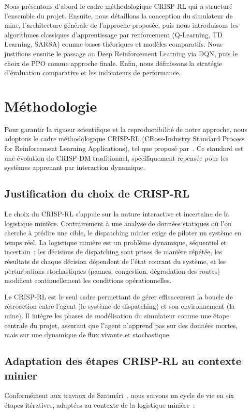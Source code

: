 \documentclass[11pt,a4paper]{report}
\begin{document}
Nous présentons d'abord le cadre méthodologique CRISP-RL qui a structuré l'ensemble du projet. Ensuite, nous détaillons la conception du simulateur de mine, l'architecture générale de l'approche proposée, puis nous introduisons les algorithmes classiques d'apprentissage par renforcement (Q-Learning, TD Learning, SARSA) comme bases théoriques et modèles comparatifs. Nous justifions ensuite le passage au Deep Reinforcement Learning via DQN, puis le choix de PPO comme approche finale. Enfin, nous définissons la stratégie d'évaluation comparative et les indicateurs de performance.

\section{Méthodologie}
\label{sec:crisp-rl}
Pour garantir la rigueur scientifique et la reproductibilité de notre approche, nous adoptons le cadre méthodologique CRISP-RL (CRoss-Industry Standard Process for Reinforcement Learning Applications), tel que proposé par~\cite{Szatmári2025}. Ce standard est une évolution du CRISP-DM traditionnel, spécifiquement repensée pour les systèmes apprenant par interaction dynamique.

\subsection{Justification du choix de CRISP-RL}
\label{sec:justification-crisp-rl}
Le choix du CRISP-RL s'appuie sur la nature interactive et incertaine de la logistique minière. Contrairement à une analyse de données statiques où l'on cherche à prédire une cible, le dispatching minier exige de piloter un système en temps réel. La logistique minière est un problème dynamique, séquentiel et incertain~: les décisions de dispatching sont prises de manière répétée, les résultats de chaque décision dépendent de l'état courant du système, et les perturbations stochastiques (pannes, congestion, dégradation des routes) modifient continuellement les conditions opérationnelles.

Le CRISP-RL est le seul cadre permettant de gérer efficacement la boucle de rétroaction entre l'agent (le système de dispatching) et son environnement (la mine). Il intègre les phases de modélisation du simulateur comme une étape centrale du projet, assurant que l'agent n'apprend pas sur des données mortes, mais sur une dynamique de flux vivante et stochastique.

\subsection{Adaptation des étapes CRISP-RL au contexte minier}
\label{sec:adaptation-crisp-rl}
Conformément aux travaux de Szatmári~\cite{Szatmári2025}, nous suivons un cycle de vie en six étapes itératives, adaptées au contexte de la logistique minière~:
\end{document}
